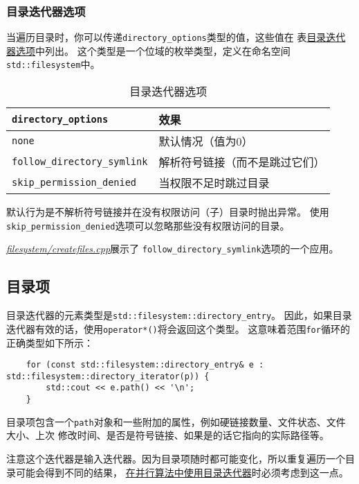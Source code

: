 \subsubsection{目录迭代器选项}
当遍历目录时，你可以传递\texttt{directory\_options}类型的值，这些值在
表\hyperref[t20.21]{目录迭代器选项}中列出。
这个类型是一个位域的枚举类型，定义在命名空间
\texttt{std::filesystem}中。
\begin{table}[htb]
    \centering
    \begin{tabular}{l|l}
        \hline
        \texttt{directory\_options}         & \textbf{效果}     \\
        \hline
        \texttt{none}                       & 默认情况（值为0）       \\
        \texttt{follow\_directory\_symlink} & 解析符号链接（而不是跳过它们） \\
        \texttt{skip\_permission\_denied}   & 当权限不足时跳过目录      \\
        \hline
    \end{tabular}
    \caption{目录迭代器选项}
    \label{t20.21}
\end{table}

默认行为是不解析符号链接并在没有权限访问（子）目录时抛出异常。
使用\texttt{skip\_permission\_denied}选项可以忽略那些没有权限访问的目录。

\hyperref[ch20.1.3]{\emph{filesystem/createfiles.cpp}}展示了
\texttt{follow\_directory\_symlink}选项的一个应用。

\subsection{目录项}
目录迭代器的元素类型是\texttt{std::filesystem::directory\_entry}。
因此，如果目录迭代器有效的话，使用\texttt{operator*()}将会返回这个类型。
这意味着范围\texttt{for}循环的正确类型如下所示：
\begin{lstlisting}
    for (const std::filesystem::directory_entry& e : std::filesystem::directory_iterator(p)) {
        std::cout << e.path() << '\n';
    }
\end{lstlisting}
目录项包含一个\texttt{path}对象和一些附加的属性，例如硬链接数量、文件状态、文件大小、上次
修改时间、是否是符号链接、如果是的话它指向的实际路径等。

注意这个迭代器是输入迭代器。因为目录项随时都可能变化，所以重复遍历一个目录可能会得到不同的结果，
\hyperref[ch22.6.1.4]{在并行算法中使用目录迭代器}时必须考虑到这一点。

